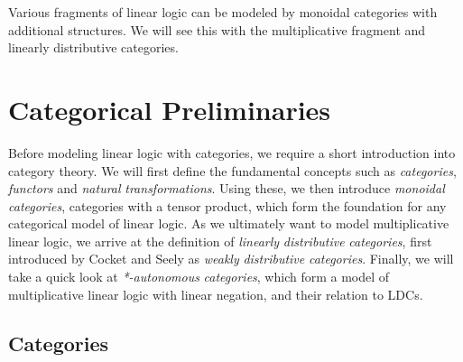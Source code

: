 \documentclass[DIN, pagenumber=false, fontsize=11pt, parskip=half, colorinlistoftodos, svgnames]{scrartcl}
\newcommand{\urgentnote}[2][]{\todo[color=red, #1]{#2}}
\begin{document}
	
	Various fragments of linear logic can be modeled by monoidal categories with additional structures. We will see this with the multiplicative fragment and linearly distributive categories.
	
	
	
	
	
	

	
	\section{Categorical Preliminaries}
	\label{sec: catPrel}
	
	Before modeling linear logic with categories, we require a short introduction into category theory. 
	We will first define the fundamental concepts such as \emph{categories}, \emph{functors} and \emph{natural} \emph{transformations}. 
	Using these, we then introduce \emph{monoidal} \emph{categories}, categories with a tensor product, which form the foundation for any categorical model of linear logic. 
	As we ultimately want to model multiplicative linear logic, we arrive at the definition of \emph{linearly} \emph{distributive} \emph{categories}, first introduced by Cocket and Seely \cite{cockett&seely97} as \emph{weakly} \emph{distributive} \emph{categories}. 
	Finally, we will take a quick look at \emph{*-autonomous} \emph{categories}, which form a model of multiplicative linear logic with linear negation, and their relation to LDCs.
	
	
	\subsection{Categories}
	\label{subsec: catSec}
	
\end{document}
